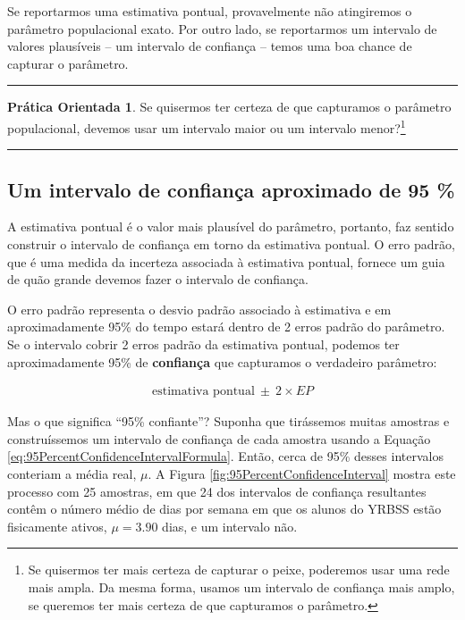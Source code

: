 \documentclass[
]{book}
\theoremstyle{definition}
\theoremstyle{definition}
\theoremstyle{definition}
\newtheorem{exercise}{Prática Orientada}[chapter]
\theoremstyle{definition}
\theoremstyle{remark}
\begin{document}
Se reportarmos uma estimativa pontual, provavelmente não atingiremos o parâmetro populacional exato. Por outro lado, se reportarmos um intervalo de valores plausíveis -- um intervalo de confiança -- temos uma boa chance de capturar o parâmetro.

\begin{center}\rule{0.5\linewidth}{0.5pt}\end{center}

\begin{exercise}
\protect\hypertarget{exr:unnamed-chunk-154}{}{\label{exr:unnamed-chunk-154} }Se quisermos ter certeza de que capturamos o parâmetro populacional, devemos usar um intervalo maior ou um intervalo menor?\footnote{Se quisermos ter mais certeza de capturar o peixe, poderemos usar uma rede mais ampla. Da mesma forma, usamos um intervalo de confiança mais amplo, se queremos ter mais certeza de que capturamos o parâmetro.}
\end{exercise}

\begin{center}\rule{0.5\linewidth}{0.5pt}\end{center}

\hypertarget{confidenceIntervalApproximate95}{%
\subsection{Um intervalo de confiança aproximado de 95 \%}\label{confidenceIntervalApproximate95}}

A estimativa pontual é o valor mais plausível do parâmetro, portanto, faz sentido construir o intervalo de confiança em torno da estimativa pontual. O erro padrão, que é uma medida da incerteza associada à estimativa pontual, fornece um guia de quão grande devemos fazer o intervalo de confiança.

O erro padrão representa o desvio padrão associado à estimativa e em aproximadamente 95\% do tempo estará dentro de 2 erros padrão do parâmetro. Se o intervalo cobrir 2 erros padrão da estimativa pontual, podemos ter aproximadamente 95\% de \textbf{confiança} que capturamos o verdadeiro parâmetro:

\begin{eqnarray}
\text{estimativa pontual}\ \pm\ 2\times EP
\label{eq:95PercentConfidenceIntervalFormula}
\end{eqnarray}

Mas o que significa ``95\% confiante''? Suponha que tirássemos muitas amostras e construíssemos um intervalo de confiança de cada amostra usando a Equação \eqref{eq:95PercentConfidenceIntervalFormula}. Então, cerca de 95\% desses intervalos conteriam a média real, \(\mu\). A Figura \ref{fig:95PercentConfidenceInterval} mostra este processo com 25 amostras, em que 24 dos intervalos de confiança resultantes contêm o número médio de dias por semana em que os alunos do YRBSS estão fisicamente ativos, \(\mu=3.90\) dias, e um intervalo não.
\end{document}
